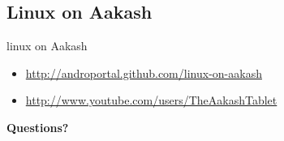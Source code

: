 \documentclass{beamer}
\begin{document}
\subsection{Linux on Aakash}
\begin{frame}{linux on Aakash}
  \begin{block}{}
    \begin{itemize}
    \item \url{http://androportal.github.com/linux-on-aakash}
    \item \url{http://www.youtube.com/users/TheAakashTablet}
    \end{itemize}
  \end{block}
\end{frame}



\begin{frame}{}
  \centerline{\bf Questions?}
\end{frame}
\end{document}
